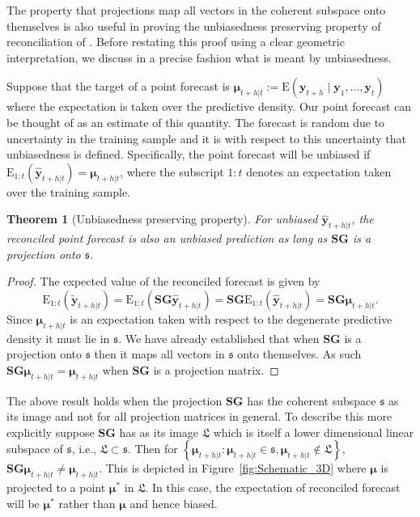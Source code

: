 \documentclass[12pt]{article}
\def\E{\text{E}}
\newtheorem{theo}{Theorem}[section]
\theoremstyle{definition}
\begin{document}
The property that projections map all vectors in the coherent subspace onto themselves is also useful in proving the unbiasedness preserving property of reconciliation of \citet{WicEtAl2019}. Before restating this proof using a clear geometric interpretation, we discuss in a precise fashion what is meant by unbiasedness.

Suppose that the target of a point forecast is $\bm{\mu}_{t+h|t}:=\E(\bm{y}_{t+h}\mid\bm{y}_{1},\dots,\bm{y}_{t})$ where the expectation is taken over the predictive density. Our point forecast can be thought of as an estimate of this quantity. The forecast is random due to uncertainty in the training sample and it is with respect to this uncertainty that unbiasedness is defined. Specifically, the point forecast will be unbiased if $\E_{1:t}(\hat{\bm{y}}_{t+h|t})=\bm{\mu}_{t+h|t}$, where the subscript $1:t$ denotes an expectation taken over the training sample.

\begin{theo}[Unbiasedness preserving property]
  For unbiased $\hat{\bm{y}}_{t+h|t}$, the reconciled point forecast is also an unbiased prediction as long as $\bm{S}\bm{G}$ is a projection onto $\mathfrak{s}$.
\end{theo}
\begin{proof}
  The expected value of the reconciled forecast is given by
  \[
    \E_{1:t}(\tilde{\bm{y}}_{t+h|t})
      = \E_{1:t}(\bm{S}\bm{G}\hat{\bm{y}}_{t+h|t})
      = \bm{S}\bm{G}\E_{1:t}(\hat{\bm{y}}_{t+h|t})
      = \bm{S}\bm{G}\bm{\mu}_{t+h|t}.
  \]
  Since $\bm{\mu}_{t+h|t}$ is an expectation taken with respect to the degenerate predictive density it must lie in $\mathfrak{s}$. We have already established that when $\bm{S}\bm{G}$ is a projection onto $\mathfrak{s}$ then it maps all vectors in $\mathfrak{s}$ onto themselves. As such $\bm{S}\bm{G}\bm{\mu}_{t+h|t}=\bm{\mu}_{t+h|t}$ when $\bm{S}\bm{G}$ is a projection matrix.
\end{proof}

The above result holds when the projection $\bm{S}\bm{G}$ has the coherent subspace $\mathfrak{s}$ as its image and not for all projection matrices in general. To describe this more explicitly suppose $\bm{S}\bm{G}$ has as its image $\mathfrak{L}$ which is itself a lower dimensional linear subspace of $\mathfrak{s}$, i.e., $\mathfrak{L}\subset\mathfrak{s}$. Then for $\left\{\bm{\mu}_{t+h|t}:\bm{\mu}_{t+h|t}\in\mathfrak{s},\bm{\mu}_{t+h|t}\notin\mathfrak{L}\right\}$, $\bm{S}\bm{G}\bm{\mu}_{t+h|t} \ne \bm{\mu}_{t+h|t}$. This is depicted in Figure~\ref{fig:Schematic_3D} where $\bm{\mu}$ is projected to a point ${\bm{\mu}^*}$ in $\mathfrak{L}$. In this case, the expectation of reconciled forecast will be ${\bm{\mu}^*}$ rather than $\bm{\mu}$ and hence biased.
\end{document}
